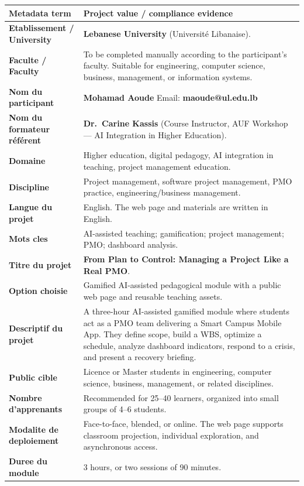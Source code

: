 \documentclass[11pt,a4paper]{article}
\begin{document}
\begin{longtable}{>{\bfseries}p{4.6cm}p{9.9cm}}
\textbf{Metadata term} & \textbf{Project value / compliance evidence} \\
\hline
Etablissement / University & \textbf{Lebanese University} (Université Libanaise). \\
Faculte / Faculty & To be completed manually according to the participant's faculty. Suitable for engineering, computer science, business, management, or information systems. \\
Nom du participant & \textbf{Mohamad Aoude} \quad Email: \textbf{maoude@ul.edu.lb} \\
Nom du formateur référent & \textbf{Dr.\ Carine Kassis} (Course Instructor, AUF Workshop --- AI Integration in Higher Education). \\
Domaine & Higher education, digital pedagogy, AI integration in teaching, project management education. \\
Discipline & Project management, software project management, PMO practice, engineering/business management. \\
Langue du projet & English. The web page and materials are written in English. \\
Mots cles & AI-assisted teaching; gamification; project management; PMO; dashboard analysis. \\
Titre du projet & \textbf{From Plan to Control: Managing a Project Like a Real PMO}. \\
Option choisie & Gamified AI-assisted pedagogical module with a public web page and reusable teaching assets. \\
Descriptif du projet & A three-hour AI-assisted gamified module where students act as a PMO team delivering a Smart Campus Mobile App. They define scope, build a WBS, optimize a schedule, analyze dashboard indicators, respond to a crisis, and present a recovery briefing. \\
Public cible & Licence or Master students in engineering, computer science, business, management, or related disciplines. \\
Nombre d'apprenants & Recommended for 25--40 learners, organized into small groups of 4--6 students. \\
Modalite de deploiement & Face-to-face, blended, or online. The web page supports classroom projection, individual exploration, and asynchronous access. \\
Duree du module & 3 hours, or two sessions of 90 minutes. \\

\end{longtable}
\end{document}
